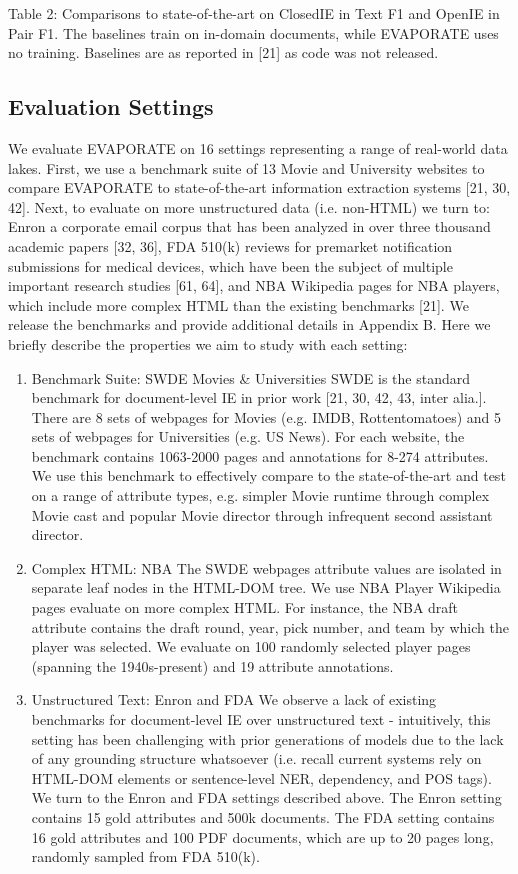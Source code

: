 \documentclass[10pt]{article}
\begin{document}
Table 2: Comparisons to state-of-the-art on ClosedIE in Text F1 and OpenIE in Pair F1. The baselines train on in-domain documents, while EVAPORATE uses no training. Baselines are as reported in [21] as code was not released.

\subsection{Evaluation Settings}
We evaluate EVAPORATE on 16 settings representing a range of real-world data lakes. First, we use a benchmark suite of 13 Movie and University websites to compare EVAPORATE to state-of-the-art information extraction systems [21, 30, 42]. Next, to evaluate on more unstructured data (i.e. non-HTML) we turn to: Enron a corporate email corpus that has been analyzed in over three thousand academic papers [32, 36], FDA 510(k) reviews for premarket notification submissions for medical devices, which have been the subject of multiple important research studies [61, 64], and NBA Wikipedia pages for NBA players, which include more complex HTML than the existing benchmarks [21]. We release the benchmarks and provide additional details in Appendix B. Here we briefly describe the properties we aim to study with each setting:

\begin{enumerate}
  \item Benchmark Suite: SWDE Movies \& Universities SWDE is the standard benchmark for document-level IE in prior work [21, 30, 42, 43, inter alia.]. There are 8 sets of webpages for Movies (e.g. IMDB, Rottentomatoes) and 5 sets of webpages for Universities (e.g. US News). For each website, the benchmark contains 1063-2000 pages and annotations for 8-274 attributes. We use this benchmark to effectively compare to the state-of-the-art and test on a range of attribute types, e.g. simpler Movie runtime through complex Movie cast and popular Movie director through infrequent second assistant director.

  \item Complex HTML: NBA The SWDE webpages attribute values are isolated in separate leaf nodes in the HTML-DOM tree. We use NBA Player Wikipedia pages evaluate on more complex HTML. For instance, the NBA draft attribute contains the draft round, year, pick number, and team by which the player was selected. We evaluate on 100 randomly selected player pages (spanning the 1940s-present) and 19 attribute annotations.

  \item Unstructured Text: Enron and FDA We observe a lack of existing benchmarks for document-level IE over unstructured text - intuitively, this setting has been challenging with prior generations of models due to the lack of any grounding structure whatsoever (i.e. recall current systems rely on HTML-DOM elements or sentence-level NER, dependency, and POS tags). We turn to the Enron and FDA settings described above. The Enron setting contains 15 gold attributes and 500k documents. The FDA setting contains 16 gold attributes and 100 PDF documents, which are up to 20 pages long, randomly sampled from FDA 510(k).

\end{enumerate}
\end{document}
